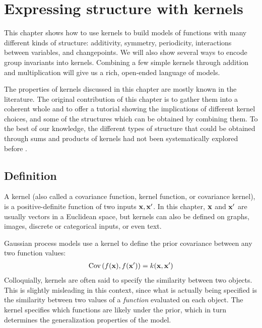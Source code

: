 
\inbpdocument

\chapter{Expressing structure with kernels}
\label{ch:kernels}

This chapter shows how to use kernels to build models of functions with many different kinds of structure: additivity, symmetry, periodicity, interactions between variables, and changepoints.
We will also show several ways to encode group invariants into kernels.
Combining a few simple kernels through addition and multiplication will give us a rich, open-ended language of models.

The properties of kernels discussed in this chapter are mostly known in the literature.
The original contribution of this chapter is to gather them into a coherent whole and to offer a tutorial showing the implications of different kernel choices, and some of the structures which can be obtained by combining them.
To the best of our knowledge, the different types of structure that could be obtained through sums and products of kernels had not been systematically explored before \citet{DuvLloGroetal13}.


\section{Definition}

A kernel (also called a covariance function, kernel function, or covariance kernel), is a positive-definite function of two inputs ${\bf{x}}, {\bf{x}}'$. %
In this chapter, ${\bf{x}}$ and ${\bf{x}}'$ are usually vectors in a Euclidean space, but kernels can also be defined on graphs, images, discrete or categorical inputs, or even text.

Gaussian process models use a kernel to define the prior covariance between any two function values:
%
\begin{align}
\textrm{Cov}\left(f({\bf{x}}), f({\bf{x}}') \right) = k({\bf{x}},{\bf{x}}')
\end{align}
%
Colloquially, kernels are often said to specify the similarity between two objects.
This is slightly misleading in this context, since what is actually being specified is the similarity between two values of a \emph{function} evaluated on each object.
The kernel specifies which functions are likely under the \gp{} prior, which in turn determines the generalization properties of the model.






